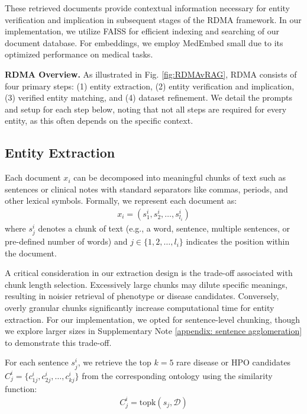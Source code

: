 These retrieved documents provide contextual information necessary for entity verification and implication in subsequent stages of the RDMA framework. In our implementation, we utilize FAISS \cite{douze2025faisslibrary} for efficient indexing and searching of our document database. For embeddings, we employ MedEmbed small \cite{balachandran2024medembed} due to its optimized performance on medical tasks.

\textbf{RDMA Overview.} As illustrated in Fig. \ref{fig:RDMAvRAG}, RDMA consists of four primary steps: (1) entity extraction, (2) entity verification and implication, (3) verified entity matching, and (4) dataset refinement. We detail the prompts and setup for each step below, noting that not all steps are required for every entity, as this often depends on the specific context.

\subsection{Entity Extraction}
Each document $x_i$ can be decomposed into meaningful chunks of text such as sentences or clinical notes with standard separators like commas, periods, and other lexical symbols. Formally, we represent each document as:
\begin{align}
x_i = (s_1^i, s_2^i, \ldots, s_{l_i}^i)
\end{align}
where $s_j^i$ denotes a chunk of text (e.g., a word, sentence, multiple sentences, or pre-defined number of words) and $j \in \{1, 2, \ldots, l_i\}$ indicates the position within the document.

A critical consideration in our extraction design is the trade-off associated with chunk length selection. Excessively large chunks may dilute specific meanings, resulting in noisier retrieval of phenotype or disease candidates. Conversely, overly granular chunks significantly increase computational time for entity extraction. For our implementation, we opted for sentence-level chunking, though we explore larger sizes in Supplementary Note \ref{appendix: sentence agglomeration} to demonstrate this trade-off.

For each sentence $s_j^i$, we retrieve the top $k=5$ rare disease or HPO candidates $C_j^i = \{c_{1j}^i, c_{2j}^i, \ldots, c_{kj}^i\}$ from the corresponding ontology using the similarity function:
\begin{align}
C_j^i = \text{topk}(s_j,\mathcal{D})
\end{align}

